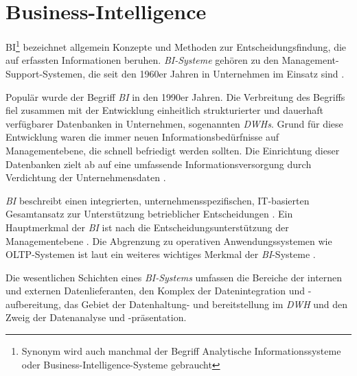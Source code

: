 \section{Business-Intelligence}
\label{chap:two_three}
\acrfull{BI}\footnote{ Synonym wird auch manchmal der Begriff Analytische Informationssysteme oder Business-Intelligence-Systeme gebraucht}
bezeichnet allgemein Konzepte und Methoden zur Entscheidungsfindung, die auf erfassten Informationen beruhen. 
\textit{\acrlong{BI}-Systeme} gehören zu den Management-Support-Systemen, die seit den 1960er Jahren in Unternehmen im Einsatz sind \cite[vgl.][83]{gronwald_integrierte_2020}.

Populär wurde der Begriff \textit{\acrshort{BI}} in den 1990er Jahren. Die Verbreitung des Begriffs fiel zusammen mit der 
Entwicklung einheitlich strukturierter und dauerhaft verfügbarer Datenbanken in Unternehmen, sogenannten \textit{\acrlong{DWH}s}. 
Grund für diese Entwicklung waren die immer neuen Informationsbedürfnisse auf Managementebene, die schnell befriedigt werden sollten.
Die Einrichtung dieser Datenbanken zielt ab auf eine umfassende Informationsversorgung durch Verdichtung der Unternehmensdaten 
\cite[vgl.][S. 268 ff.]{abts_grundkurs_2017}. 

\textit{\acrshort{BI}} beschreibt einen integrierten, unternehmensspezifischen,
IT-basierten Gesamtansatz zur Unterstützung betrieblicher Entscheidungen \cite[vgl.][270]{abts_grundkurs_2017}. 
Ein Hauptmerkmal der \textit{\acrshort{BI}} ist nach  die Entscheidungsunterstützung der Managementebene
\cite[vgl.][111]{linden_geschaftsmodellbasierte_2016}. Die Abgrenzung zu operativen
Anwendungssystemen wie \acrfull{OLTP}-Systemen ist laut \citeauthor{abts_grundkurs_2017} ein weiteres wichtiges Merkmal der \textit{\acrshort{BI}}-Systeme \cite[vgl.][267]{abts_grundkurs_2017}. 

Die wesentlichen Schichten eines \textit{\acrshort{BI}-Systems} umfassen die Bereiche der internen und externen Datenlieferanten, den Komplex der Datenintegration und -aufbereitung, 
das Gebiet der Datenhaltung- und bereitstellung im \textit{\acrlong{DWH}} und den Zweig der Datenanalyse und -präsentation\cites[vgl.][8]{kemper_business_2010}[vgl.][S. 126 ff.]{linden_geschaftsmodellbasierte_2016}. 

